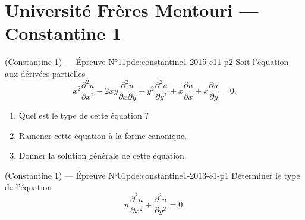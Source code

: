 \section{Université Frères Mentouri --- Constantine 1}
\begin{problem}{(Constantine 1) — Épreuve N°11}{pde:constantine1-2015-e11-p2}
Soit l'équation aux dérivées partielles
$$x^2\frac{\partial^2u}{\partial x^2}-2xy\frac{\partial^2u}{\partial x\partial y}+y^2\frac{\partial^2u}{\partial y^2}+x\frac{\partial u}{\partial x}+x\frac{\partial u}{\partial y}=0.$$
\begin{enumerate}\item Quel est le type de cette équation ?\item Ramener cette équation à la forme canonique.\item Donner la solution générale de cette équation.\end{enumerate}
\end{problem}
\newpage
\begin{problem}{(Constantine 1) — Épreuve N°01}{pde:constantine1-2013-e1-p1}
Déterminer le type de l'équation
$$y\,\frac{\partial^2u}{\partial x^2}+\frac{\partial^2u}{\partial y^2}=0.$$
\end{problem}
\newpage

